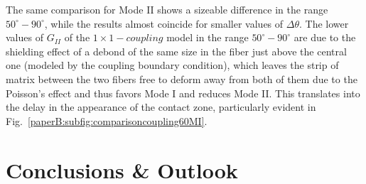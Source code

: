 The same comparison for Mode II shows a sizeable difference in the range $50^{\circ}-90^{\circ}$, while the results almost coincide for smaller values of $\Delta\theta$. The lower values of $G_{II}$ of the $1\times 1-coupling$ model in the range $50^{\circ}-90^{\circ}$ are due to the shielding effect of a debond of the same size in the fiber just above the central one (modeled by the coupling boundary condition), which leaves the strip of matrix between the two fibers free to deform away from both of them due to the Poisson's effect and thus favors Mode I and reduces Mode II. This translates into the delay in the appearance of the contact zone, particularly evident in Fig.~\ref{paperB:subfig:comparisoncoupling60MI}.

\section{Conclusions \& Outlook}

